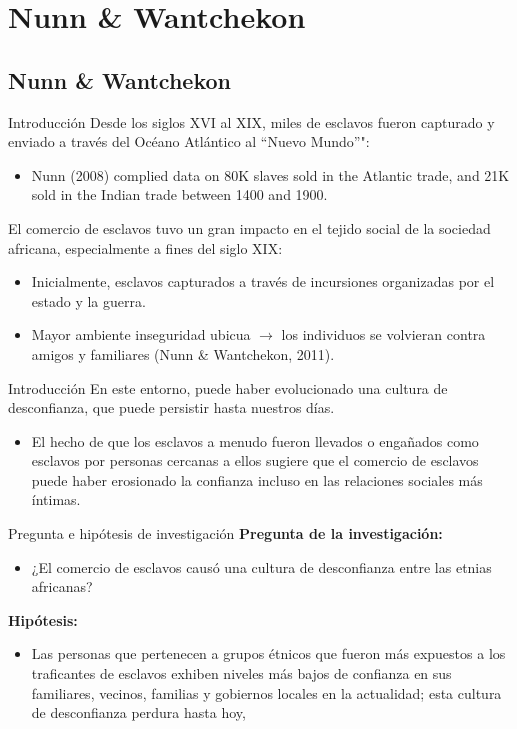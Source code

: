 \documentclass[11pt, aspectratio=169, compress]{beamer}
\begin{document}
\section{Nunn \& Wantchekon}
\subsection{Nunn \& Wantchekon}
\begin{frame}{Introducción}
Desde los siglos XVI al XIX, miles de esclavos fueron capturado y enviado a través del Océano Atlántico al ``Nuevo Mundo''": 
\begin{itemize}
	\item Nunn (2008) complied data on 80K slaves sold in the Atlantic
	trade, and 21K sold in the Indian trade between 1400 and 1900.
\end{itemize}
El comercio de esclavos tuvo un gran impacto en el tejido social de la sociedad africana, especialmente a fines del siglo XIX: 
\begin{itemize}
	\item  Inicialmente, esclavos capturados a través de incursiones organizadas por el estado y la guerra. 
	\item Mayor ambiente inseguridad ubicua $ \rightarrow $ los individuos se volvieran contra amigos y familiares (Nunn \& Wantchekon, 2011). 
\end{itemize}
\end{frame}
\begin{frame}{Introducción}
En este entorno, puede haber evolucionado una cultura de desconfianza, que puede persistir hasta nuestros días.
\begin{itemize}
	\item El hecho de que los esclavos a menudo fueron llevados o engañados como esclavos por personas cercanas a ellos sugiere que el comercio de esclavos puede haber erosionado la confianza incluso en las relaciones sociales más íntimas.
\end{itemize}
\end{frame}
\begin{frame}{Pregunta e hipótesis de investigación}
\textbf{Pregunta de la investigación: }
\begin{itemize}
	\item ¿El comercio de esclavos causó una cultura de desconfianza entre las etnias africanas?
\end{itemize}
\textbf{Hipótesis: }
\begin{itemize}
	\item Las personas que pertenecen a grupos étnicos que fueron más expuestos a los traficantes de esclavos exhiben niveles más bajos de confianza en sus familiares, vecinos, familias y gobiernos locales en la actualidad; esta cultura de desconfianza perdura hasta hoy, 
\end{itemize}
\end{frame}
\end{document}
